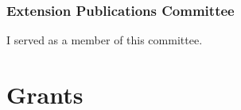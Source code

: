 \documentclass[12pt,english]{scrartcl}
\begin{document}
\subsubsection{Extension Publications Committee}

I served as a member of this committee.

\begin{comment}
\raggedright\vspace{2mm}\textbf{Reference(s)}

\begin{btSect}[vancouver]{zotero}
\btPrintCited
\end{btSect}
\end{comment}

\appendix

\section{Grants}

\begin{comment}
\begin{tabular}{>{\raggedright}p{2in}>{\raggedright}p{2in}>{\centering}p{0.5in}>{\raggedleft}p{1in}}
\hline 
\textbf{Funding Source} & \textbf{Title} & \textbf{Years} & \textbf{Budget}\tabularnewline
\hline 
\textbf{Active} &  &  & \tabularnewline
\hline 
Farm Bill 2017 \cite{moore2017farmbill} & Biological Control of Coconut Rhinoceros Beetle Biotype-G & 1 & \$200,000\tabularnewline
\hline 
Farm Bill 2018 \cite{moore2018farmbill} & Biological Control of Coconut Rhinoceros Beetle Biotype-G & 1 & \$200,000\tabularnewline
\hline 
Department of the Interior - Office of Insular Affairs

\cite{moore2017doiproposal} & Biological Control of Coconut Rhinoceros Beetle Biotype-G in Micronesia & 2 & \$176,553\tabularnewline
\hline 
McIntire-Stennis \cite{moore2018mcintirestennis2}  & Guam Forest Insect Survey & 4 & \$40,000\tabularnewline
\hline 
National Plant Diagnostic Network 2017 \cite{moore2018university}
\cite{moore2018npdnaccomplishments} &  & 1 & \$10,000\tabularnewline
\hline 
\textbf{Pending} &  &  & \tabularnewline
\hline 
Farm Bill 2019

\cite{moore2018fy19farm,moore2018fy19farm2} & Biological Control of Coconut Rhinoceros Beetle Biotype-G & 1 & \$282,044\tabularnewline
\hline 
McIntire-Stennis \cite{moore2018mcintirestennis} &  & 5 & \$80,000\tabularnewline
\hline 
National Plant Diagnostic Network &  & 1 & \$10,000\tabularnewline
\hline 
\end{tabular}

\end{comment}
\end{document}
